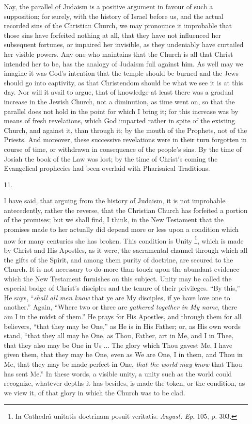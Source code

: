 Nay, the parallel of Judaism is a positive argument in favour of
such a supposition; for surely, with the history of Israel before us,
and the actual recorded sins of the Christian Church, we may pronounce
it improbable that those sins have forfeited nothing at all, that they
have not influenced her subsequent fortunes, or impaired her
invisible, as they undeniably have curtailed her visible powers. Any
one who maintains that the Church is all that Christ intended her to
be, has the analogy of Judaism full against him. As well may we
imagine it was God's intention that the temple should be burned and
the Jews should go into captivity, as that Christendom should be what
we see it is at this day. Nor will it avail to argue, that of
knowledge at least there was a gradual increase in the Jewish Church,
not a diminution, as time went on, so that the parallel does not hold
in the point for which I bring it; for this increase was by means of
fresh revelations, which God imparted rather in spite of the existing
Church, and against it, than through it; by the mouth of the Prophets,
not of the Priests. And moreover, these successive revelations were in
their turn forgotten in course of time, or withdrawn in consequence of
the people's sins. By the time of Josiah the book of the Law was lost; by the time of Christ's coming the Evangelical prophecies had
been overlaid with Pharisaical Traditions.

11.

I have said, that arguing from the history of Judaism, it is not
improbable antecedently, rather the reverse, that the Christian Church
has forfeited a portion of the promises; but we shall find, I think,
in the New Testament that the promises made to her actually did depend
more or less upon a condition which now for many centuries she has
broken. This condition is Unity \footnote{In Cathedrâ unitatis doctrinam posuit
veritatis. \emph{August. Ep}. 105, p. 303.}, which is made by Christ and His Apostles, as it were, the
sacramental channel through which all the gifts of the Spirit, and
among them purity of doctrine, are secured to the Church. It is not
necessary to do more than touch upon the abundant evidence which the
New Testament furnishes on this subject. Unity may be called the
especial badge of Christ's disciples and the tenure of their
privileges. ``By this,'' He says, ``\emph{shall all men know}
that ye are My disciples, if ye have love one to another.'' Again,
``Where two or three are \emph{gathered together in My name},
there am I in the midst of them.'' He prays for His Apostles, and
through them for all believers, ``that they may be One,'' as
He is in His Father; or, as His own words stand, ``that they all
may be One, as Thou, Father, art in Me, and I in Thee, that they also
may be One in Us ... The glory which Thou gavest Me, I have given
them, that they may be One, even as We are One, I in them, and Thou in
Me, that they may be made perfect in One, \emph{that the world may know}
that Thou has sent Me.'' In these words, a visible unity, a unity
such as the world could recognize, whatever depths it has besides, is
made the token, or the condition, as we view it, of that glory in
which the Church was to be clad.

